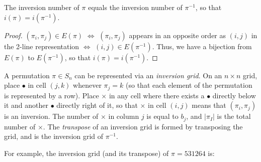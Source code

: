 \documentclass[a4paper]{article}
\begin{document}
\begin{theorem}
The inversion number of $\pi$ equals the inversion number of $\pi^{-1}$, so that $i(\pi)=i(\pi^{-1})$.

\begin{hl}
\begin{proof}
$(\pi_i,\pi_j)\in E(\pi)$ $\iff$ $(\pi_i,\pi_j)$ appears in an opposite order as $(i,j)$ in the 2-line representation $\iff$ $(i,j)\in E(\pi^{-1})$. Thus, we have a bijection from $E(\pi)$ to $E(\pi^{-1})$, so that $i(\pi)=i(\pi^{-1})$.
\end{proof}
\end{hl}
\end{theorem}

\begin{definition}
A permutation $\pi\in S_n$ can be represented via an \emph{inversion grid}. On an $n\times n$ grid, place $\bullet$ in cell $(j,k)$ whenever $\pi_j=k$ (so that each element of the permutation is represented by a row). Place $\times$ in any cell where there exists a $\bullet$ directly below it and another $\bullet$ directly right of it, so that $\times$ in cell $(i,j)$ means that $(\pi_i,\pi_j)$ is an inversion. The number of $\times$ in column $j$ is equal to $b_j$, and $|\pi_I|$ is the total number of $\times$. The \emph{transpose} of an inversion grid is formed by transposing the grid, and is the inversion grid of $\pi^{-1}$.

\medskip

For example, the inversion grid (and its transpose) of $\pi=531264$ is:


\end{definition}
\end{document}
